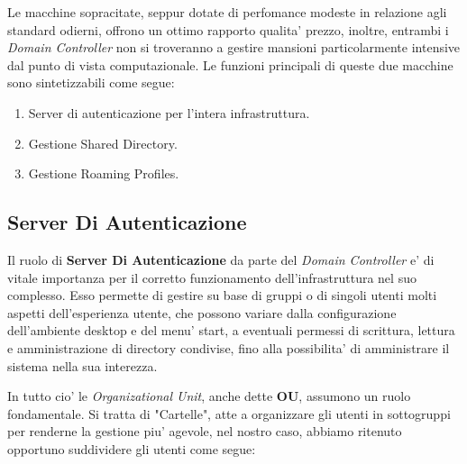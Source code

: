 \documentclass{report}
\begin{document}
        Le macchine sopracitate, seppur dotate di perfomance modeste in relazione agli standard odierni, offrono un ottimo 
         rapporto qualita' prezzo, inoltre, entrambi i \emph{Domain Controller} non si troveranno a gestire mansioni 
         particolarmente intensive dal punto di vista computazionale.
        Le funzioni principali di queste due macchine sono sintetizzabili come segue:
        \begin{enumerate}
            \item Server di autenticazione per l'intera infrastruttura.
            \item Gestione Shared Directory.
            \item Gestione Roaming Profiles.
        \end{enumerate}
            \subsection{Server Di Autenticazione}
            Il ruolo di \textbf{Server Di Autenticazione} da parte del \emph{Domain Controller} e' di vitale importanza
             per il corretto funzionamento dell'infrastruttura nel suo complesso. Esso permette di gestire su base di 
             gruppi o di singoli utenti molti aspetti dell'esperienza utente, che possono variare dalla configurazione
             dell'ambiente desktop e del menu' start, a eventuali permessi di scrittura, lettura e amministrazione di
             directory condivise, fino alla possibilita' di amministrare il sistema nella sua interezza.
            
            In tutto cio' le \emph{Organizational Unit}, anche dette \textbf{OU}, assumono un ruolo fondamentale. Si 
             tratta di "Cartelle", atte a organizzare gli utenti in sottogruppi per renderne la gestione piu' agevole,
             nel nostro caso, abbiamo ritenuto opportuno suddividere gli utenti come segue:
\end{document}
